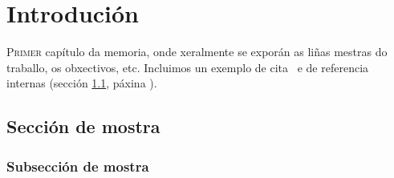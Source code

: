 \chapter{Introdución}
\label{chap:introducion}

\lettrine{P}{rimer} capítulo da memoria, onde xeralmente se exporán as
liñas mestras do traballo, os obxectivos, etc. Incluimos un exemplo de
cita~\cite{ErlangBook} e de referencia internas (sección
\ref{sec:mostra}, páxina \pageref{sec:mostra}).

\Blindtext

\section{Sección de mostra}
\label{sec:mostra}

\Blindtext

\subsection{Subsección de mostra}

\Blindtext
